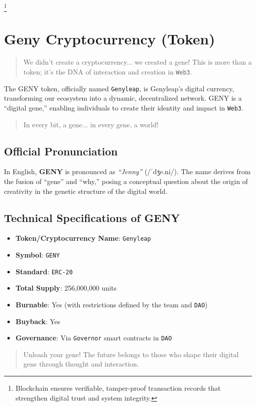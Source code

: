 \documentclass[a4paper,12pt,openany]{book}
\begin{document}
\footnote{Blockchain ensures verifiable, tamper-proof transaction records that strengthen digital trust and system integrity.}

\chapter{Geny Cryptocurrency (Token)}
\begin{quote}
We didn’t create a cryptocurrency... we created a gene! This is more than a token; it’s the DNA of interaction and creation in \texttt{Web3}.
\end{quote}
The GENY token, officially named \texttt{Genyleap}, is Genyleap’s digital currency, transforming our ecosystem into a dynamic, decentralized network. GENY is a “digital gene,” enabling individuals to create their identity and impact in \texttt{Web3}.
\begin{quote}
In every bit, a gene... in every gene, a world!
\end{quote}

\section*{Official Pronunciation}
In English, \textbf{GENY} is pronounced as \textit{``Jenny''} ({\ipafont /ˈdʒe.ni/}). The name derives from the fusion of “gene” and “why,” posing a conceptual question about the origin of creativity in the genetic structure of the digital world.

\section*{Technical Specifications of GENY}
\begin{itemize}
    \item \textbf{Token/Cryptocurrency Name}: \texttt{Genyleap}
    \item \textbf{Symbol}: \texttt{GENY}
    \item \textbf{Standard}: \texttt{ERC-20}
    \item \textbf{Total Supply}: 256,000,000 units
    \item \textbf{Burnable}: Yes (with restrictions defined by the team and \texttt{DAO})
    \item \textbf{Buyback}: Yes
    \item \textbf{Governance}: Via \texttt{Governor} smart contracts in \texttt{DAO}
\end{itemize}
\vspace{-0.5em}
\begin{quote}
Unleash your gene! The future belongs to those who shape their digital gene through thought and interaction.
\end{quote}
\newpage
\end{document}
